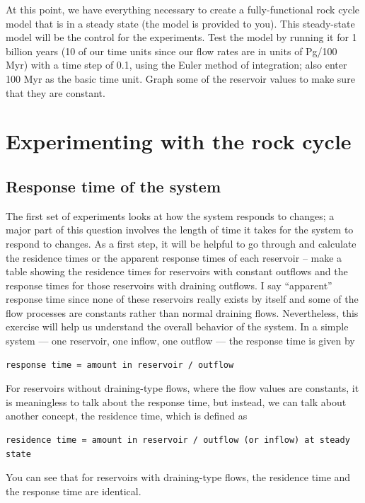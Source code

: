 \documentclass[11pt,letterpaper]{article}
\begin{document}
At this point, we have everything necessary to create a fully-functional rock cycle model that is in a steady state (the model is provided to you). This steady-state model will be the control for the experiments. Test the model by running it for 1 billion years (10 of our time units since our flow rates are in units of Pg/100 Myr) with a time step of 0.1, using the Euler method of integration; also enter 100 Myr as the basic time unit. Graph some of the reservoir values to make sure that they are constant. 

\section{Experimenting with the rock cycle}
\subsection{Response time of the system}
The first set of experiments looks at how the system responds to changes; a major part of this question involves the length of time it takes for the system to respond to changes. As a first step, it will be helpful to go through and calculate the residence times or the apparent response times of each reservoir -- make a table showing the residence times for reservoirs with constant outflows and the response times for those reservoirs with draining outflows. I say ``apparent'' response time since none of these reservoirs really exists by itself and some of the flow processes are constants rather than normal draining flows. Nevertheless, this exercise will help us understand the overall behavior of the system. In a simple system --- one reservoir, one inflow, one outflow --- the response time is given by

\begin{verbatim}
response time = amount in reservoir / outflow
\end{verbatim}

For reservoirs without draining-type flows, where the flow values are constants, it is meaningless to talk about the response time, but instead, we can talk about another concept, the residence time, which is defined as

\begin{verbatim}
residence time = amount in reservoir / outflow (or inflow) at steady state
\end{verbatim}

You can see that for reservoirs with draining-type flows, the residence time and the response time are identical.
\end{document}
